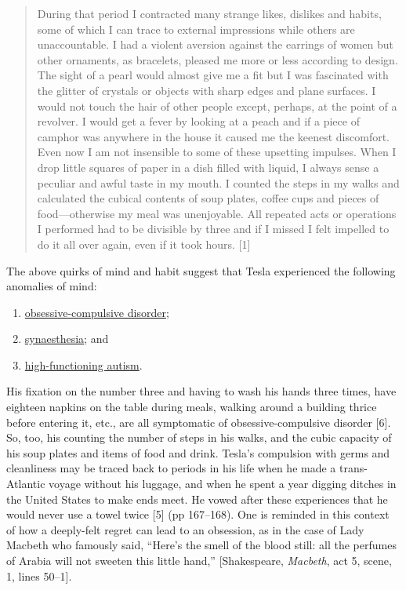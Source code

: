 \documentclass[
  11pt,
  a4paper,
]{article}
\providecommand{\tightlist}{%
  \setlength{\itemsep}{0pt}\setlength{\parskip}{0pt}}
\begin{document}
\begin{quote}
During that period I contracted many strange likes, dislikes and habits,
some of which I can trace to external impressions while others are
unaccountable. I had a violent aversion against the earrings of women
but other ornaments, as bracelets, pleased me more or less according to
design. The sight of a pearl would almost give me a fit but I was
fascinated with the glitter of crystals or objects with sharp edges and
plane surfaces. I would not touch the hair of other people except,
perhaps, at the point of a revolver. I would get a fever by looking at a
peach and if a piece of camphor was anywhere in the house it caused me
the keenest discomfort. Even now I am not insensible to some of these
upsetting impulses. When I drop little squares of paper in a dish filled
with liquid, I always sense a peculiar and awful taste in my mouth. I
counted the steps in my walks and calculated the cubical contents of
soup plates, coffee cups and pieces of food---otherwise my meal was
unenjoyable. All repeated acts or operations I performed had to be
divisible by three and if I missed I felt impelled to do it all over
again, even if it took hours. {[}1{]}
\end{quote}

The above quirks of mind and habit suggest that Tesla experienced the
following anomalies of mind:

\begin{enumerate}
\tightlist
\item
  \href{https://en.wikipedia.org/wiki/Obsessive\%E2\%80\%93compulsive_disorder}{obsessive-compulsive
  disorder};
\item
  \href{https://en.wikipedia.org/wiki/Synesthesia}{synaesthesia}; and
\item
  \href{https://en.wikipedia.org/wiki/High-functioning_autism}{high-functioning
  autism}.
\end{enumerate}

His fixation on the number three and having to wash his hands three
times, have eighteen napkins on the table during meals, walking around a
building thrice before entering it, etc., are all symptomatic of
obsessive-compulsive disorder {[}6{]}. So, too, his counting the number
of steps in his walks, and the cubic capacity of his soup plates and
items of food and drink. Tesla's compulsion with germs and cleanliness
may be traced back to periods in his life when he made a trans-Atlantic
voyage without his luggage, and when he spent a year digging ditches in
the United States to make ends meet. He vowed after these experiences
that he would never use a towel twice {[}5{]} (pp 167--168). One is
reminded in this context of how a deeply-felt regret can lead to an
obsession, as in the case of Lady Macbeth who famously said, ``Here's
the smell of the blood still: all the perfumes of Arabia will not
sweeten this little hand,'' {[}Shakespeare, \emph{Macbeth}, act 5,
scene, 1, lines 50--1{]}.
\end{document}
